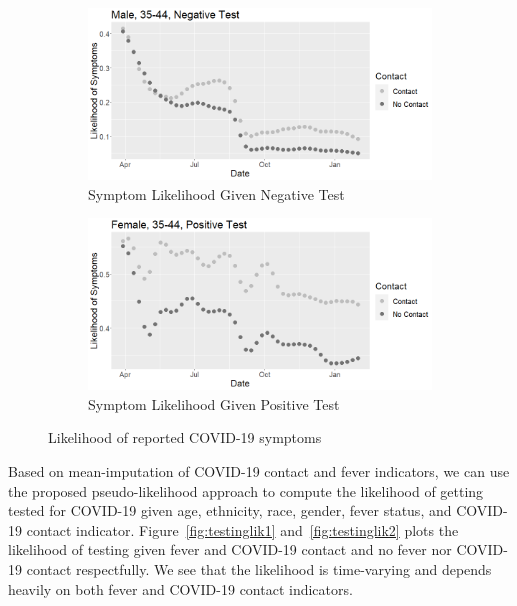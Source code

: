 \documentclass[11pt]{amsart}
\numberwithin{equation}{section}
\theoremstyle{plain}
\begin{document}
\begin{figure}[!th]
\centering
\begin{subfigure}{.5\textwidth}
 \centering
 \includegraphics[width=.9\linewidth]{../figs/tvprop_symptom_fig1.png}
 \caption{Symptom Likelihood Given Negative Test}
 \label{fig:symptomlik1}
\end{subfigure}%
\begin{subfigure}{.5\textwidth}
 \centering
\includegraphics[width=.9\linewidth]{../figs/tvprop_symptom_fig2.png}
 \caption{Symptom Likelihood Given Positive Test}
 \label{fig:symptomlik2}
\end{subfigure}
\caption{Likelihood of reported COVID-19 symptoms}
\label{fig:symptomlik}
\end{figure}

Based on mean-imputation of COVID-19 contact and fever indicators, we can use the proposed pseudo-likelihood approach to compute the likelihood of getting tested for COVID-19 given age, ethnicity, race, gender, fever status, and COVID-19 contact indicator.  Figure~\ref{fig:testinglik1} and~\ref{fig:testinglik2} plots the likelihood of testing given fever and COVID-19 contact and no fever nor COVID-19 contact respectfully.  We see that the likelihood is time-varying and depends heavily on both fever and COVID-19 contact indicators.
\end{document}
